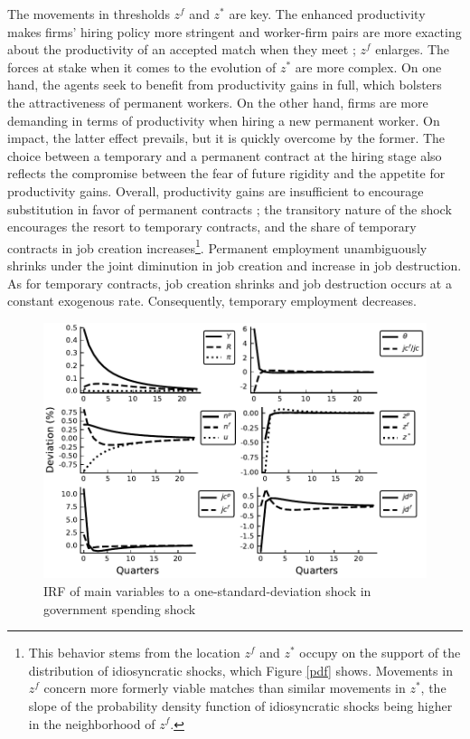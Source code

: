 \documentclass[a4paper]{article}
\begin{document}
The movements in thresholds $z^f$ and $z^*$ are key. The enhanced productivity makes firms' hiring policy more stringent and worker-firm pairs are more exacting about the productivity of an accepted match when they meet ; $z^f$ enlarges. The forces at stake when it comes to the evolution of $z^*$ are more complex. On one hand, the agents seek to benefit from productivity gains in full, which bolsters the attractiveness of permanent workers. On the other hand, firms are more demanding in terms of productivity when hiring a new permanent worker. On impact, the latter effect prevails, but it is quickly overcome by the former. The choice between a temporary and a permanent contract at the hiring stage also reflects the compromise between the fear of future rigidity and the appetite for productivity gains. Overall, productivity gains are insufficient to encourage substitution in favor of permanent contracts ; the transitory nature of the shock encourages the resort to temporary contracts, and the share of temporary contracts in job creation increases\footnote{This behavior stems from the location $z^f$ and $z^*$ occupy on the support of the distribution of idiosyncratic shocks, which Figure \ref{pdf} shows. Movements in $z^f$ concern more formerly viable matches than similar movements in $z^*$, the slope of the probability density function of idiosyncratic shocks being higher in the neighborhood of $z^f$.}. Permanent employment unambiguously shrinks under the joint diminution in job creation and increase in job destruction. As for temporary contracts, job creation shrinks and job destruction occurs at a constant exogenous rate. Consequently, temporary employment decreases. 

\begin{figure}[t]
\includegraphics[scale=1]{IRF_g.pdf}
\caption{IRF of main variables to a one-standard-deviation shock in government spending shock}
\label{IRF_g}
\end{figure}
\end{document}

